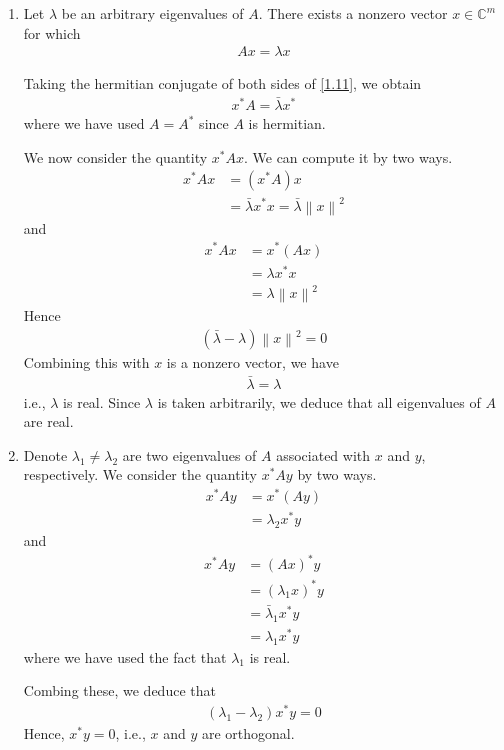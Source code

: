 \documentclass[a4paper,oneside]{book}
\numberwithin{equation}{chapter}
\begin{document}
\begin{enumerate}
\item Let $\lambda$ be an arbitrary eigenvalues of $A$. There exists a nonzero vector $x \in \mathbb{C}^m$ for which
\begin{align}
\label{1.11}
Ax = \lambda x
\end{align}

Taking the hermitian conjugate of both sides of \eqref{1.11}, we obtain
\begin{align}
{x^*}A = \bar \lambda {x^*}
\end{align}
where we have used $A=A^*$ since $A$ is hermitian. 

We now consider the quantity ${x^*}Ax$. We can compute it by two ways.
\begin{align}
{x^*}Ax &= \left( {{x^*}A} \right)x\\
 &= \bar \lambda {x^*}x = \bar \lambda {\left\| x \right\|^2}
\end{align}
and
\begin{align}
{x^*}Ax &= {x^*}\left( {Ax} \right)\\
 &= \lambda {x^*}x\\
 &= \lambda {\left\| x \right\|^2}
\end{align}
Hence
\begin{align}
\left( {\bar \lambda  - \lambda } \right){\left\| x \right\|^2} = 0
\end{align}
Combining this with $x$ is a nonzero vector, we have
\begin{align}
{\bar \lambda  = \lambda }
\end{align}
i.e., $\lambda$ is real. Since $\lambda$ is taken arbitrarily, we deduce that all eigenvalues of $A$ are real.
\item Denote $\lambda _1 \ne \lambda _2$ are two eigenvalues of $A$ associated with $x$ and $y$, respectively. We consider the quantity ${x^*}Ay$ by two ways.
\begin{align}
{x^*}Ay &= {x^*}\left( {Ay} \right)\\
 &= {\lambda _2}{x^*}y
\end{align}
and
\begin{align}
{x^*}Ay &= {\left( {Ax} \right)^*}y\\
 &= {\left( {{\lambda _1}x} \right)^*}y\\
 &= {{\bar \lambda }_1}{x^*}y\\
 &= {\lambda _1}{x^*}y
\end{align}
where we have used the fact that $\lambda _1$ is real.

Combing these, we deduce that
\begin{align}
\left( {{\lambda _1} - {\lambda _2}} \right){x^*}y = 0
\end{align}
Hence, ${x^*}y = 0$, i.e., $x$ and $y$ are orthogonal.
\end{enumerate}
\end{document}
